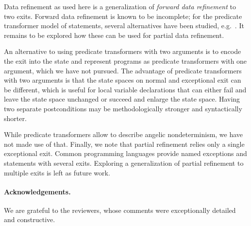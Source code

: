 \documentclass[submission,copyright,creativecommons]{eptcs}
\begin{document}
Data refinement as used here is a generalization of \emph{forward data refinement} to two exits. Forward data refinement is known to be incomplete; for the predicate transformer model of statements, several alternatives have been studied, e.g.~\cite{GardinerMorgan93RuleDataRefinement, vonWright94LatticeDataRefinement}. It remains to be explored how these can be used for partial data refinement.

An alternative to using predicate transformers with two arguments is to encode the exit into the state and represent programs as predicate transformers with one argument, which we have not pursued. The advantage of predicate transformers with two arguments is that the state spaces on normal and exceptional exit can be different, which is useful for local variable declarations that can either fail and leave the state space unchanged or succeed and enlarge the state space. Having two separate postconditions may be methodologically stronger and syntactically shorter.

While predicate transformers allow to describe angelic nondeterminism, we have not made use of that. Finally, we note that partial refinement relies only a single exceptional exit. Common programming languages provide named exceptions and statements with several exits. Exploring a generalization of partial refinement to multiple exits is left as future work.

\paragraph{Acknowledgements.} We are grateful to the reviewers, whose comments were exceptionally detailed and constructive.



\end{document}
